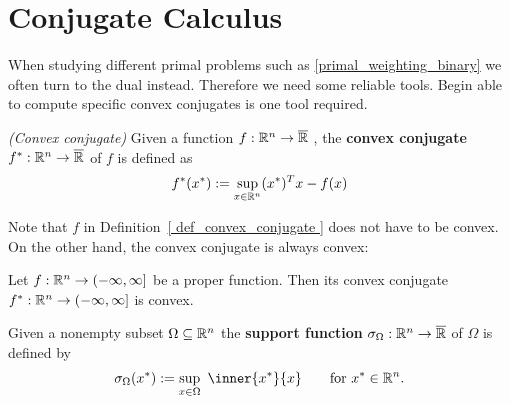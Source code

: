 \section{Conjugate Calculus}
When studying different primal problems such as \eqref{primal_weighting_binary} we often turn to the dual instead.
Therefore we need some reliable tools.
Begin able to compute specific convex conjugates is one tool required.


\begin{definition}
  \label{ def_convex_conjugate }
  \emph{(Convex conjugate)}
  Given a function
  $
    f:
    \mathbb{R}^n \to \overline{\mathbb{R}}
  $
  ,
  the 
  \textbf{convex conjugate}
  $
    f^*:
    \mathbb{R}^n \to \overline{\mathbb{R}}
  $
  of $f$ is defined as
  \begin{gather}
    f^*(x^*)
    :=
    \sup_{ x \in \mathbb{R}^n }
    (x^*)^T x - f(x)
  \end{gather}
\end{definition}

Note that $f$ in Definition~\ref{ def_convex_conjugate }
does not have to be convex. On the other hand, the convex conjugate is always convex:

\begin{proposition}
  Let  
  $
    f:
    \mathbb{R}^n \to ( - \infty, \infty ]
  $
  be a proper function. 
  Then its convex conjugate
  $
    f^*:
    \mathbb{R}^n \to ( - \infty, \infty ]
  $
  is convex.
\end{proposition}

\begin{definition}
  Given a nonempty subset 
  $\Omega \subseteq \mathbb{R}^n$
  the \textbf{support function} 
  $
  \sigma_\Omega : \mathbb{R}^n \to \overline{\mathbb{R}}
  $
  of $\Omega$
  is defined by
  \begin{gather}
    \sigma_\Omega
    (x^*)
    :=
    \sup_{x \in \Omega}
    \ 
    \inner{x^*}{x}
    \qquad
    \text{for}\ 
    x^* \in \R^n
    .
  \end{gather}
\end{definition}

